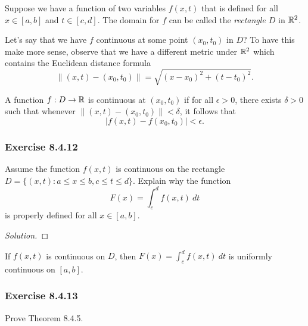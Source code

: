 Suppose we have a function of two variables \( f(x,t)  \) that is defined for all \(  x \in [a,b]  \) and \( t \in [c, d]  \). The domain for  \( f  \) can be called the \textit{rectangle \( D  \)} in \( \mathbb{R}^{2} \). 

Let's say that we have \( f  \) continuous at some point \( (x_{0}, t_{0}) \) in \(  D  \)? To have this make more sense, observe that we have a different metric under \( \mathbb{R}^{2} \) which contains the Euclidean distance formula 
\[  \lVert (x,t) - (x_{0}, t_{0}) \rVert = \sqrt{ (x - x_{0})^{2} + (t - t_{0})^{2}  }. \]

\begin{definition}{}{}
   A function \( f: D \to \mathbb{R}   \)  is continuous at \( (x_{0}, t_{0})  \) if for all \( \epsilon > 0  \), there exists \( \delta > 0  \) such that whenever \( \lVert (x,t) - (x_{0}, t_{0})  \rVert < \delta  \), it follows that 
   \[  | f(x,t) - f(x_{0}, t_{0})  | < \epsilon. \]
\end{definition}

\subsubsection{Exercise 8.4.12} Assume the function \( f(x,t)  \) is continuous on the rectangle \( D = \{ (x,t) : a \leq x \leq b , c \leq t \leq d  \}. \) Explain why the function
\[  F(x) = \int_{ c }^{ d } f(x,t) \ dt \] is properly defined for all \( x \in [a,b]  \).
\begin{proof}[Solution]

\end{proof}

\begin{theorem}{}{}
    If \( f(x,t)  \) is continuous on \( D  \), then \( F(x) = \int_{ c }^{ d } f(x,t) \ dt \) is uniformly continuous on \( [a,b]  \).
\end{theorem}

\subsubsection{Exercise 8.4.13} Prove Theorem 8.4.5. 

